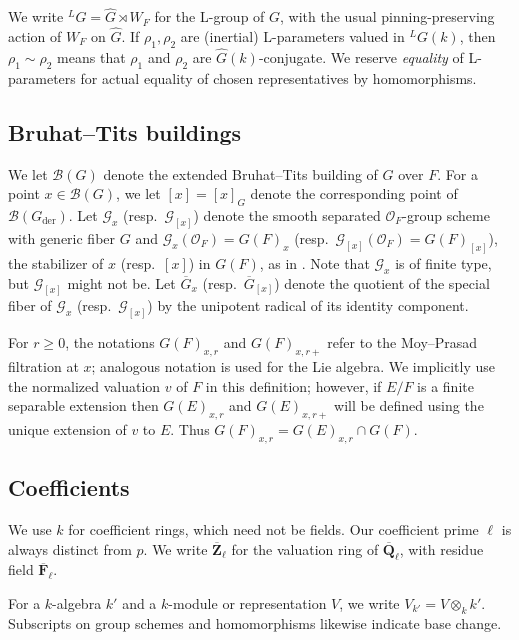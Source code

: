 \documentclass[reqno]{amsart}
\numberwithin{equation}{subsection}
\newcommand{\F}{\mathbf{F}}
\newcommand{\Q}{\mathbf{Q}}
\newcommand{\Z}{\mathbf{Z}}
\newcommand{\ol}[1]{\overline{#1}}
\newcommand{\wh}[1]{\widehat{#1}}
\newcommand{\ld}{{}^L}
\newcommand\cB{\mathcal{B}}
\newcommand\cG{\mathcal{G}}
\newcommand\cO{\mathcal{O}}
\DeclareMathOperator{\der}{der}
\theoremstyle{remark}
\numberwithin{equation}{subsection}
\numberwithin{figure}{subsection}
\begin{document}
We write $\ld G=\wh G\rtimes W_F$ for the L-group of $G$, with the usual pinning-preserving action of $W_F$ on $\wh G$. If $\rho_1,\rho_2$ are (inertial) L-parameters valued in $\ld G(k)$, then $\rho_1\sim\rho_2$ means that $\rho_1$ and $\rho_2$ are $\wh G(k)$-conjugate. We reserve \emph{equality} of L-parameters for actual equality of chosen representatives by homomorphisms.


\subsection{Bruhat--Tits buildings}
We let $\cB(G)$ denote the extended Bruhat--Tits building of $G$ over $F$. For a point $x \in \cB(G)$, we let $[x] = [x]_G$ denote the corresponding point of $\cB(G_{\der})$. Let $\cG_x$ (resp.\ $\cG_{[x]}$) denote the smooth separated $\cO_F$-group scheme with generic fiber $G$ and $\cG_x(\cO_F) = G(F)_x$ (resp.\ $\cG_{[x]}(\cO_F) = G(F)_{[x]}$), the stabilizer of $x$ (resp.\ $[x]$) in $G(F)$, as in \cite[Remark 8.3.4]{KP}. Note that $\cG_x$ is of finite type, but $\cG_{[x]}$ might not be. Let $\ol G_x$ (resp.\ $\ol G_{[x]}$) denote the quotient of the special fiber of $\cG_x$ (resp.\ $\cG_{[x]}$) by the unipotent radical of its identity component.

For $r\geq 0$, the notations $G(F)_{x,r}$ and $G(F)_{x,r+}$ refer to the Moy--Prasad filtration at $x$; analogous notation is used for the Lie algebra. We implicitly use the normalized valuation $v$ of $F$ in this definition; however, if $E/F$ is a finite separable extension then $G(E)_{x,r}$ and $G(E)_{x,r+}$ will be defined using the unique extension of $v$ to $E$. Thus $G(F)_{x,r} = G(E)_{x,r} \cap G(F)$.


\subsection{Coefficients}\label{sssec:coefficient-conventions}
We use $k$ for coefficient rings, which need not be fields. Our coefficient prime $\ell$ is always distinct from $p$. We write $\ol\Z_\ell$ for the valuation ring of $\ol\Q_\ell$, with residue field $\ol\F_\ell$.

For a $k$-algebra $k'$ and a $k$-module or representation $V$, we write $V_{k'}=V\otimes_k k'$. Subscripts on group schemes and homomorphisms likewise indicate base change.

 





\end{document}
